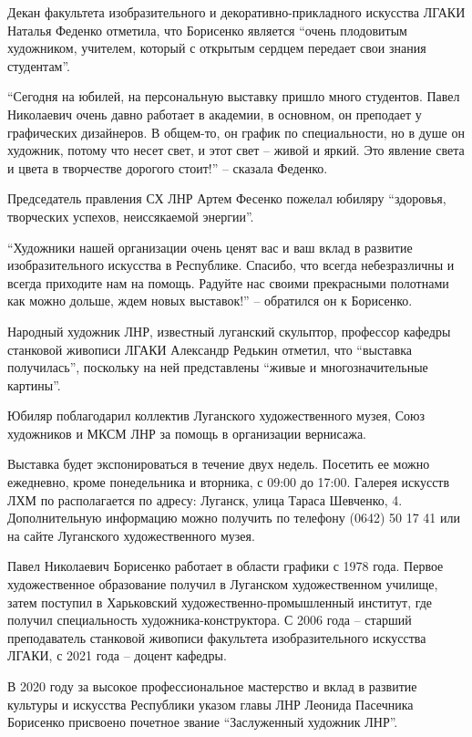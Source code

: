 
Декан факультета изобразительного и декоративно-прикладного искусства ЛГАКИ
Наталья Феденко отметила, что Борисенко является \enquote{очень плодовитым художником,
учителем, который с открытым сердцем передает свои знания студентам}.

\enquote{Сегодня на юбилей, на персональную выставку пришло много студентов. Павел
Николаевич очень давно работает в академии, в основном, он преподает у
графических дизайнеров. В общем-то, он график по специальности, но в душе он
художник, потому что несет свет, и этот свет – живой и яркий. Это явление света
и цвета в творчестве дорогого стоит!} – сказала Феденко.

Председатель правления СХ ЛНР Артем Фесенко пожелал юбиляру \enquote{здоровья,
творческих успехов, неиссякаемой энергии}.

\enquote{Художники нашей организации очень ценят вас и ваш вклад в развитие
изобразительного искусства в Республике. Спасибо, что всегда небезразличны и
всегда приходите нам на помощь. Радуйте нас своими прекрасными полотнами как
можно дольше, ждем новых выставок!} – обратился он к Борисенко.

Народный художник ЛНР, известный луганский скульптор, профессор кафедры
станковой живописи ЛГАКИ Александр Редькин отметил, что \enquote{выставка получилась},
поскольку на ней представлены \enquote{живые и многозначительные картины}.

Юбиляр поблагодарил коллектив Луганского художественного музея, Союз художников
и МКСМ ЛНР за помощь в организации вернисажа.

Выставка будет экспонироваться в течение двух недель. Посетить ее можно
ежедневно, кроме понедельника и вторника, с 09:00 до 17:00. Галерея искусств
ЛХМ по располагается по адресу: Луганск, улица Тараса Шевченко, 4.
Дополнительную информацию можно получить по телефону (0642) 50 17 41 или на
сайте Луганского художественного музея.

Павел Николаевич Борисенко работает в области графики с 1978 года. Первое
художественное образование получил в Луганском художественном училище, затем
поступил в Харьковский художественно-промышленный институт, где получил
специальность художника-конструктора. С 2006 года – старший преподаватель
станковой живописи факультета изобразительного искусства ЛГАКИ, с 2021 года –
доцент кафедры.

В 2020 году за высокое профессиональное мастерство и вклад в развитие культуры
и искусства Республики указом главы ЛНР Леонида Пасечника Борисенко присвоено
почетное звание \enquote{Заслуженный художник ЛНР}.
